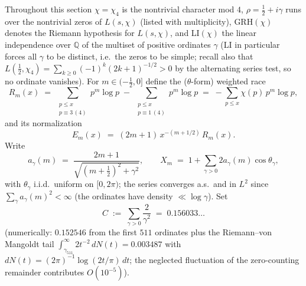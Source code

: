 Throughout this section $\chi=\chi_4$ is the nontrivial character mod
$4$, $\rho=\tfrac12+i\gamma$ runs over the nontrivial zeros of
$L(s,\chi)$ (listed with multiplicity), GRH$(\chi)$ denotes the Riemann
hypothesis for $L(s,\chi)$, and LI$(\chi)$ the linear independence over
$\mathbb Q$ of the multiset of positive ordinates $\gamma$ (LI in
particular forces all $\gamma$ to be distinct, i.e.\ the zeros to be
simple; recall also that $L(\tfrac12,\chi_4)=\sum_{k\ge0}(-1)^k(2k+1)^{-1/2}>0$
by the alternating series test, so no ordinate vanishes). For
$m\in(-\tfrac12,0]$ define the ($\theta$-form) weighted race
\[
R_m(x)\;=\;\sum_{\substack{p\le x\\ p\equiv3\,(4)}}p^m\log p
\;-\;\sum_{\substack{p\le x\\ p\equiv1\,(4)}}p^m\log p
\;=\;-\sum_{p\le x}\chi(p)\,p^m\log p ,
\]
and its normalization
\[
E_m(x)\;=\;(2m+1)\,x^{-(m+1/2)}\,R_m(x).
\]
Write
\[
a_\gamma(m)\;=\;\frac{2m+1}{\sqrt{(m+\tfrac12)^2+\gamma^2}},
\qquad
X_m\;=\;1+\sum_{\gamma>0}2a_\gamma(m)\cos\theta_\gamma ,
\]
with $\theta_\gamma$ i.i.d.\ uniform on $[0,2\pi)$; the series converges
a.s.\ and in $L^2$ since $\sum_\gamma a_\gamma(m)^2<\infty$ (the ordinates
have density $\ll\log\gamma$). Set
\[
C\;:=\;\sum_{\gamma>0}\frac{2}{\gamma^2}\;=\;0.156033\ldots
\]
(numerically: $0.152546$ from the first $511$ ordinates plus the
Riemann--von Mangoldt tail $\int_{\gamma_{511}}^\infty 2t^{-2}\,dN(t)
=0.003487$ with $dN(t)=(2\pi)^{-1}\log(2t/\pi)\,dt$; the neglected
fluctuation of the zero-counting remainder contributes $O(10^{-5})$).

